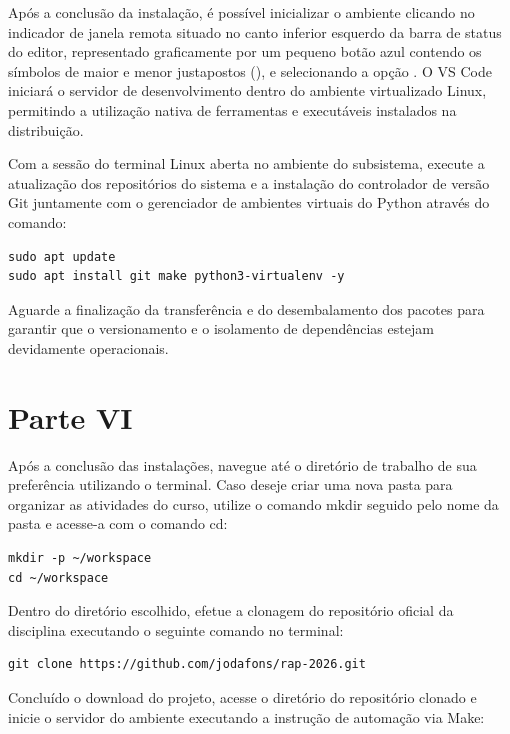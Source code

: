 Após a conclusão da instalação, é possível inicializar o ambiente clicando no indicador de janela remota situado no canto inferior esquerdo da barra de status do editor, representado graficamente por um pequeno botão azul contendo os símbolos de maior e menor justapostos (\code{><}), e selecionando a opção . O VS Code iniciará o servidor de desenvolvimento dentro do ambiente virtualizado Linux, permitindo a utilização nativa de ferramentas e executáveis instalados na distribuição.


Com a sessão do terminal Linux aberta no ambiente do subsistema, execute a atualização dos repositórios do sistema e a instalação do controlador de versão Git juntamente com o gerenciador de ambientes virtuais do Python através do comando:

\vspace{0.3cm}
\begin{lstlisting}
sudo apt update
sudo apt install git make python3-virtualenv -y
\end{lstlisting}

Aguarde a finalização da transferência e do desembalamento dos pacotes para garantir que o versionamento e o isolamento de dependências estejam devidamente operacionais.

\section*{Parte VI}

Após a conclusão das instalações, navegue até o diretório de trabalho de sua preferência utilizando o terminal. Caso deseje criar uma nova pasta para organizar as atividades do curso, utilize o comando mkdir seguido pelo nome da pasta e acesse-a com o comando cd:

\vspace{0.3cm}
\begin{lstlisting}
mkdir -p ~/workspace
cd ~/workspace
\end{lstlisting}


Dentro do diretório escolhido, efetue a clonagem do repositório oficial da disciplina executando o seguinte comando no terminal:

\vspace{0.3cm}
\begin{lstlisting}
git clone https://github.com/jodafons/rap-2026.git
\end{lstlisting}


Concluído o download do projeto, acesse o diretório do repositório clonado e inicie o servidor do ambiente executando a instrução de automação via Make:

